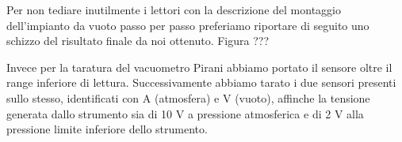 Per non tediare inutilmente i lettori con la descrizione del montaggio dell'impianto da vuoto passo per passo preferiamo riportare di seguito uno schizzo del risultato finale da noi ottenuto. Figura ???

Invece per la taratura del vacuometro Pirani abbiamo portato il sensore oltre il range inferiore di lettura. Successivamente abbiamo tarato i due sensori presenti sullo stesso, identificati con A (atmosfera) e V (vuoto), affinche la tensione generata dallo strumento sia di 10 V a pressione atmosferica e di 2 V alla pressione limite inferiore dello strumento.   